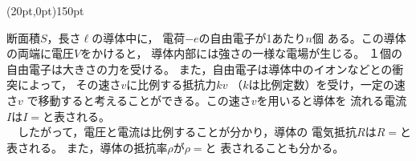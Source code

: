 \hakosyokika
\item
    \begin{mawarikomi}(20pt,0pt){150pt}{
        
        }
        断面積$S$，長さ$\ell $の導体中に，
        電荷$-e$の自由電子が1あたり$n$個
        ある。この導体の両端に電圧$V$をかけると，
        導体内部には強さ\Hako {}の一様な電場が生じる。
        １個の自由電子は大きさ\Hako {}の力を受ける。
        また，自由電子は導体中のイオンなどとの衝突によって，
        その速さ$v$に比例する抵抗力$kv$
        （$k$は比例定数）を受け，一定の速さ$v$
        で移動すると考えることができる。この速さ$v$を用いると導体を
        流れる電流$I$は$I=$\Hako {}と表される。\\
        ~~したがって，電圧と電流は比例することが分かり，導体の
        電気抵抗$R$は$R=$\Hako \tanni{\Omega }と表される。
        また，導体の抵抗率$\rho $が$\rho =$\Hako {}と
        表されることも分かる。
    \end{mawarikomi}
